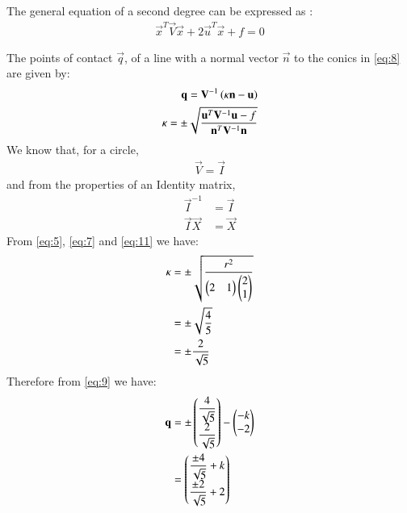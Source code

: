 \documentclass[journal,12pt,twocolumn]{IEEEtran}
\begin{document}
The general equation of a second degree can be expressed as :
\begin{align}
\vec{x}^T\vec{V}\vec{x}+2\vec{u}^T\vec{x}+f=0\label{eq:8}
\end{align}

The points of contact $\vec{q}$, of a line with a normal vector $\vec{n}$ to the conics in \eqref{eq:8} are given by:
\begin{align}
\mathbf{q} = \mathbf{V}^{-1}\left(\kappa \mathbf{n}-\mathbf{u}\right) \label{eq:9} \\
\kappa = \pm \sqrt{\frac{\mathbf{u}^T\mathbf{V}^{-1}\mathbf{u}-f}{\mathbf{n}^T\mathbf{V}^{-1}\mathbf{n}}}\label{eq:10}
\end{align}
We know that, for a circle, 
\begin{align}
\vec{V} = \vec{I}\label{eq:11}  
\end{align}
and from the properties of an Identity matrix, 
\begin{align}
\vec{I}^{-1} &= \vec{I} \\
\vec{I}\vec{X} &= \vec{X}   
\end{align}
From \eqref{eq:5}, \eqref{eq:7} and \eqref{eq:11} we have:
\begin{align}
\kappa &= \pm \sqrt{\frac{r^2}{\begin{pmatrix}2 & 1 \end{pmatrix}\begin{pmatrix}2 \\ 1 \end{pmatrix}}} \\
&= \pm \sqrt{\frac{4}{5}} \\
& =  \pm \frac{2}{\sqrt{5}}
\end{align}
Therefore from \eqref{eq:9} we have:
\begin{align}
\mathbf{q} &= \pm \begin{pmatrix}\dfrac{4}{\sqrt{5}} \\ \dfrac{2}{\sqrt{5}} \end{pmatrix} - \begin{pmatrix}-k \\ -2\end{pmatrix} \\
&=\begin{pmatrix}\dfrac{\pm 4}{\sqrt{5}} +k \\\dfrac{\pm 2}{\sqrt{5}} +2\end{pmatrix}
\end{align}
\end{document}
